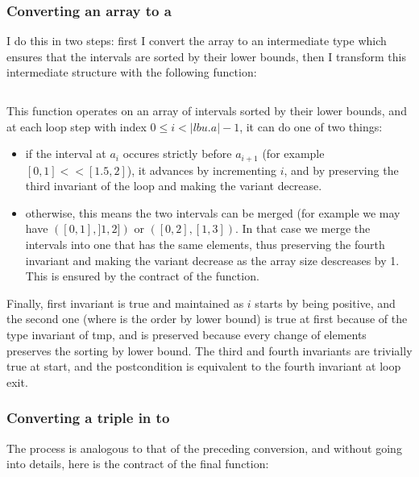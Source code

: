 \subsubsection{Converting an array to a }

I do this in two steps: first I convert the array to an intermediate type
 which ensures that the intervals are sorted by their lower
bounds, then I transform this intermediate structure with the following function:
%
\inputminted{\whyml}{why3code/lax_to_strict.mlw}
%

This function operates on an array of intervals sorted by their lower bounds, and at
each loop step with index $0\le i < |lbu.a| - 1$, it can do one of two things:
\begin{itemize}
  \item if the interval at $a_i$ occures strictly before $a_{i+1}$ (for example
    $[0,1] << [1.5,2]$), it advances by incrementing $i$, and by preserving the
    third invariant of the loop and making the variant decrease.
  \item otherwise, this means the two intervals can be merged (for example we may
    have $([0,1],]1,2])$ or $([0,2],[1,3])$. In that case we merge the intervals into
    one that has the same elements, thus preserving the fourth invariant and making
    the variant decrease as the array size descreases by 1.
    This is ensured by the contract of the  function.
\end{itemize}
Finally, first invariant is true and maintained as $i$ starts by being positive, and
the second one (where \minline{<==} is the order by lower bound) is true at first
because of the type invariant of tmp, and is preserved because every change of
elements preserves the sorting by lower bound. The third and fourth invariants are
trivially true at start, and the postcondition is equivalent to the fourth invariant
at loop exit.


\subsubsection{Converting a triple in 
  to }
The process is analogous to that of the preceding conversion, and without going into
details, here is the contract of the final function:
%
\inputminted{\whyml}{why3code/fix_untyped.mlw}
